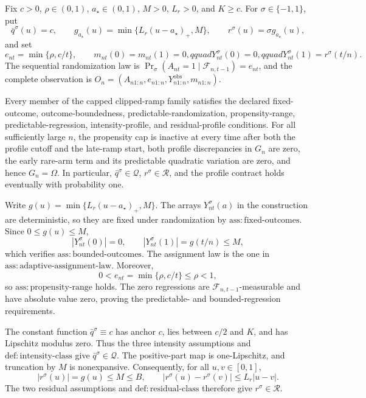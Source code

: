 Fix \(c>0\), \(\rho\in(0,1)\), \(a_\star\in(0,1)\), \(M>0\), \(L_r>0\), and \(K\ge c\). For \(\sigma\in\{-1,1\}\), put
\[
 \bar q^\sigma(u)=c,\qquad
 g_{a_\star}(u)=\min\{L_r(u-a_\star)_+,M\},\qquad
 r^\sigma(u)=\sigma g_{a_\star}(u),
\]
and set
\[
 e_{nt}=\min\{\rho,c/t\},\qquad
 m_{nt}(0)=m_{nt}(1)=0,qquad
 Y_{nt}^\sigma(0)=0,qquad
 Y_{nt}^\sigma(1)=r^\sigma(t/n).
\]
The sequential randomization law is
\(\Pr_\sigma(A_{nt}=1\mid\mathcal F_{n,t-1})=e_{nt}\), and the complete observation is \(O_n=(A_{n1:n},e_{n1:n},Y_{n1:n}^{\mathrm{obs}},m_{n1:n})\).

Every member of the capped clipped-ramp family satisfies the declared fixed-outcome, outcome-boundedness, predictable-randomization, propensity-range, predictable-regression, intensity-profile, and residual-profile conditions. For all sufficiently large \(n\), the propensity cap is inactive at every time after both the profile cutoff and the late-ramp start, both profile discrepancies in \(G_n\) are zero, the early rare-arm term and its predictable quadratic variation are zero, and hence \(G_n=\Omega\). In particular, \(\bar q^\sigma\in\mathcal Q\), \(r^\sigma\in\mathcal R\), and the profile contract holds eventually with probability one.

Write \(g(u)=\min\{L_r(u-a_\star)_+,M\}\). The arrays \(Y_{nt}^\sigma(a)\) in the construction are deterministic, so they are fixed under randomization by \(\mathrm{ass:fixed\mbox{-}outcomes}\). Since \(0\le g(u)\le M\),
\[
 |Y_{nt}^\sigma(0)|=0,
 \qquad
 |Y_{nt}^\sigma(1)|=g(t/n)\le M,
\]
which verifies \(\mathrm{ass:bounded\mbox{-}outcomes}\). The assignment law is the one in \(\mathrm{ass:adaptive\mbox{-}assignment\mbox{-}law}\). Moreover,
\[
 0<e_{nt}=\min\{\rho,c/t\}\le\rho<1,
\]
so \(\mathrm{ass:propensity\mbox{-}range}\) holds. The zero regressions are \(\mathcal F_{n,t-1}\)-measurable and have absolute value zero, proving the predictable- and bounded-regression requirements.

The constant function \(\bar q^\sigma\equiv c\) has anchor \(c\), lies between \(c/2\) and \(K\), and has Lipschitz modulus zero. Thus the three intensity assumptions and \(\mathrm{def:intensity\mbox{-}class}\) give \(\bar q^\sigma\in\mathcal Q\). The positive-part map is one-Lipschitz, and truncation by \(M\) is nonexpansive. Consequently, for all \(u,v\in[0,1]\),
\[
 |r^\sigma(u)|=g(u)\le M\le B,
 \qquad
 |r^\sigma(u)-r^\sigma(v)|
 \le L_r|u-v|.
\]
The two residual assumptions and \(\mathrm{def:residual\mbox{-}class}\) therefore give \(r^\sigma\in\mathcal R\).

